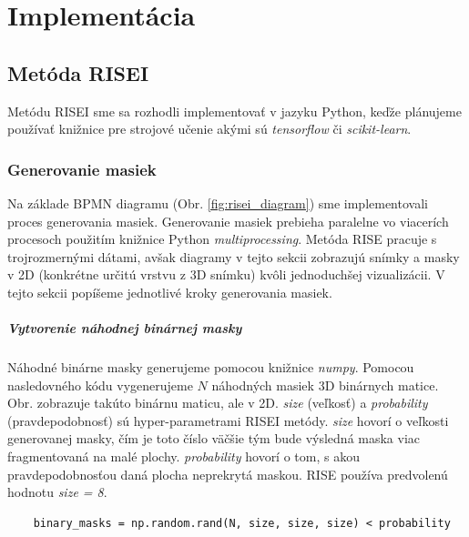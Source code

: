 \chapter{Implementácia}

\section{Metóda RISEI}

Metódu RISEI sme sa rozhodli implementovať v jazyku Python, keďže plánujeme používať knižnice pre strojové učenie akými sú \textit{tensorflow} či \textit{scikit-learn}.

\subsection{Generovanie masiek}

Na základe BPMN diagramu (Obr. \ref{fig:risei_diagram}) sme implementovali proces generovania masiek. Generovanie masiek prebieha paralelne vo viacerích procesoch použitím knižnice Python \textit{multiprocessing}. Metóda RISE pracuje s trojrozmernými dátami, avšak diagramy v tejto sekcii zobrazujú snímky a masky v 2D (konkrétne určitú vrstvu z 3D snímku) kvôli jednoduchšej vizualizácii. V tejto sekcii popíšeme jednotlivé kroky generovania masiek.

\paragraph{Vytvorenie náhodnej binárnej masky}

Náhodné binárne masky generujeme pomocou knižnice \textit{numpy}. Pomocou nasledovného kódu vygenerujeme $N$ náhodných masiek 3D binárnych matice. Obr. \label{fig:binary_mask} zobrazuje takúto binárnu maticu, ale v 2D. \textit{size} (veľkosť) a \textit{probability} (pravdepodobnosť) sú hyper-parametrami RISEI metódy. \textit{size} hovorí o veľkosti generovanej masky, čím je toto číslo väčšie tým bude výsledná maska viac fragmentovaná na malé plochy. \textit{probability} hovorí o tom, s akou pravdepodobnosťou daná plocha neprekrytá maskou. RISE používa predvolenú hodnotu \textit{size = 8}.

\begin{lstlisting}
    binary_masks = np.random.rand(N, size, size, size) < probability
\end{lstlisting}

